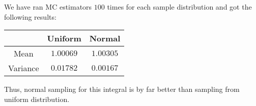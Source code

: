 \documentclass[a4paper, 12pt]{article}
\begin{document}
We have ran MC estimators $100$ times for each sample distribution
and got the following results:
\begin{table}[!h]
    \centering
    \begin{tabular}{|c|c|c|}
        \hline
                 & Uniform   & Normal    \\
        \hline
        Mean     & $1.00069$ & $1.00305$ \\
        \hline
        Variance & $0.01782$ & $0.00167$ \\
        \hline
    \end{tabular}
\end{table}

Thus, normal sampling for this integral is by far better
than sampling from uniform distribution.
\end{document}
